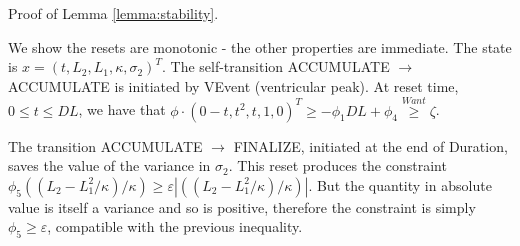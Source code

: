 Proof of Lemma \ref{lemma:stability}.
\begin{prf}
We show the resets are monotonic - the other properties are immediate.
The state is $x = (t,L_2,L_1,\kappa,\sigma_2)^T$.
The self-transition ACCUMULATE $\rightarrow$ ACCUMULATE is initiated by VEvent (ventricular peak).
At reset time, $0 \leq t \leq DL$, we have that 
$\phi\cdot(0-t,t^2,t,1,0)^T \geq -\phi_1 DL + \phi_4 \stackrel{Want}{\geq} \zeta$.

The transition ACCUMULATE $\rightarrow$ FINALIZE, initiated at the end of Duration, saves the value of the variance in $\sigma_2$.
This reset produces the constraint
$\phi_5 ((L_2 -L_1^2/\kappa)/\kappa) \geq \varepsilon |((L_2 -L_1^2/\kappa)/\kappa)|$.
But the quantity in absolute value is itself a variance and so is positive, therefore the constraint is simply $\phi_5 \geq \varepsilon$, compatible with the previous inequality.
\end{prf}